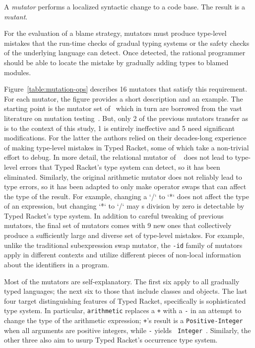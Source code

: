 
A {\it mutator\/} performs a localized syntactic change to a code base. The
result is a {\em mutant\/}.

For the evaluation of a blame strategy, mutators must produce type-level
mistakes that the run-time checks of gradual typing systems or the safety
checks of the underlying language can detect. Once detected, the rational
programmer should be able to locate the mistake by gradually adding types to
blamed modules.

Figure~\ref{table:mutation-ops} describes 16 mutators that satisfy this
requirement.  For each mutator, the figure provides a short description and an
example. The starting point is the mutator set of~\citet{lksfd-popl-2020}
which in turn are borrowed from the vast literature on mutation
testing~\cite{jia2011analysis}. But, only 2 of the previous mutators transfer
as is to the context of this study, 1 is entirely ineffective and 5 need
significant modifications. For the latter the authors relied on their
decades-long experience of making type-level mistakes in Typed Racket, some of
which take a non-trivial effort to debug.  In more detail, the relational
mutator of ~\citet{lksfd-popl-2020} does not lead to type-level errors that
Typed Racket's type system can detect, so it has been eliminated. Similarly,
the original arithmetic mutator does not reliably lead to type errors, so it
has been adapted to only make operator swaps that can affect the type of the
result. For example, changing a `/` to `*` does not affect the type of an
expression, but changing `*` to `/` may s division by zero is detectable by
Typed Racket's type system.  In addition to careful tweaking of previous
mutators, the final set of mutators comes with 9 new ones that collectively
produce a sufficiently large and diverse set of type-level mistakes.  For
example, unlike the traditional subexpression swap mutator, the {\tt -id}
family of mutators apply in different contexts and utilize different pieces of
non-local information about the identifiers in a program.

Most of the mutators are self-explanatory.  The first six apply to all
gradually typed languages; the next six to those that include classes and
objects.  The last four target distinguishing features of Typed Racket,
specifically is sophisticated type system. In particular, {\tt arithmetic}
replaces a {\tt +} with a {\tt -} in an attempt to change the type of the
arithmetic expression; {\tt +}'s result is a {\tt Positive-Integer} when all
arguments are positive integers, while {\tt -} yields {\tt
Integer}~\cite{stathff-padl-12}. Similarly, the other three also aim to usurp
Typed Racket's occurrence type system.

